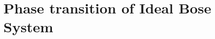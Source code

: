 \documentclass[../../PS3.tex]{subfiles}
\begin{document}
\section{Phase transition of Ideal Bose System}
\end{document}
